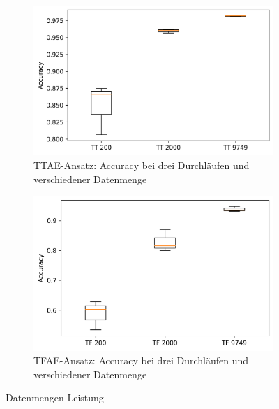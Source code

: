 	\begin{figure}[h]
		\centering
		\begin{subfigure}[c]{0.49\textwidth}			
			\includegraphics[width=1\textwidth,center]{bilder/Hauptteil/Transfer_Logs_Datenmenge/Acc_Transfer_Logs_data.png}
			\caption{TTAE-Ansatz: Accuracy bei drei Durchläufen und verschiedener Datenmenge}
			\label{img:TT_ACC_DATA}	
		\end{subfigure}
		\begin{subfigure}[c]{0.49\textwidth}			
			\includegraphics[width=1\textwidth, center]{bilder/Hauptteil/Transfer_Logs_Datenmenge/Acc_MT_Logs_data.png}
			\caption{TFAE-Ansatz: Accuracy bei drei Durchläufen und verschiedener Datenmenge}
			\label{img:TF_ACC_DATA}	
		\end{subfigure}	
		\caption{Datenmengen Leistung}
		\label{img:DatenmengenLeistung}
	\end{figure}
		
		
		
		
		
		
		
		
			
		
		
		
		
		
		
		
	
	